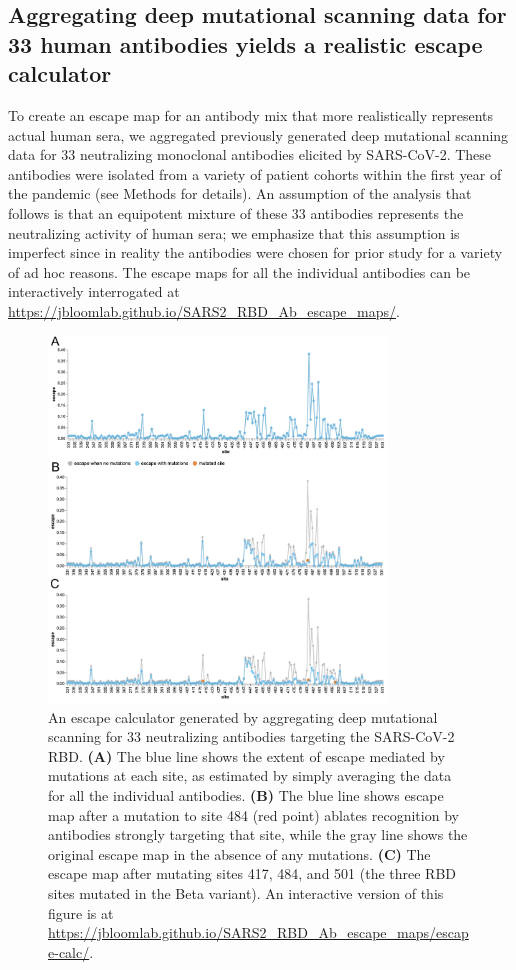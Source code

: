 \documentclass[9pt,twocolumn,twoside]{gsajnl_modified}
\begin{document}
\subsection{Aggregating deep mutational scanning data for 33 human antibodies yields a realistic escape calculator}
To create an escape map for an antibody mix that more realistically represents actual human sera, we aggregated previously generated deep mutational scanning data for 33 neutralizing monoclonal antibodies elicited by SARS-CoV-2.
These antibodies were isolated from a variety of patient cohorts within the first year of the pandemic (see Methods for details).
An assumption of the analysis that follows is that an equipotent mixture of these 33 antibodies represents the neutralizing activity of human sera; we emphasize that this assumption is imperfect since in reality the antibodies were chosen for prior study for a variety of ad hoc reasons.
The escape maps for all the individual antibodies can be interactively interrogated at \url{https://jbloomlab.github.io/SARS2_RBD_Ab_escape_maps/}.

\begin{figure}
\includegraphics[width=0.8\textwidth]{figures/escape_calc/escape_calc.pdf}
\caption{
An escape calculator generated by aggregating deep mutational scanning for 33 neutralizing antibodies targeting the SARS-CoV-2 RBD.
{\bf (A)} The blue line shows the extent of escape mediated by mutations at each site, as estimated by simply averaging the data for all the individual antibodies.
{\bf (B)} The blue line shows escape map after a mutation to site 484 (red point) ablates recognition by antibodies strongly targeting that site, while the gray line shows the original escape map in the absence of any mutations.
{\bf (C)} The escape map after mutating sites 417, 484, and 501 (the three RBD sites mutated in the Beta variant).
An interactive version of this figure is at \url{https://jbloomlab.github.io/SARS2_RBD_Ab_escape_maps/escape-calc/}.}
\label{fig:escape_calc}
\end{figure}
\end{document}
